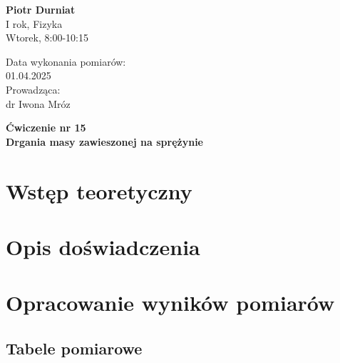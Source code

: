 \documentclass[a4paper,12pt]{article}
\begin{document}
\noindent
\begin{minipage}{0.5\textwidth}
    \raggedright
    \textbf{Piotr Durniat} \\
    I rok, Fizyka \\
    Wtorek, 8:00-10:15 \\
    \vspace{0.5cm}
    \vspace{0.5cm}
\end{minipage}%
\begin{minipage}{0.5\textwidth}
    \raggedleft
    Data wykonania pomiarów: \\
    01.04.2025 \\
    \vspace{0.5cm} %
    Prowadząca: \\
    dr Iwona Mróz
\end{minipage}

\vspace{2cm} %
\begin{center}
    \LARGE \textbf{Ćwiczenie nr 15} \\[0.5cm]
    \Large \textbf{Drgania masy zawieszonej na sprężynie}
\end{center}

\vspace{1cm} %
\noindent

\tableofcontents
\newpage

\section{Wstęp teoretyczny}

\section{Opis doświadczenia}

\section{Opracowanie wyników pomiarów}

\subsection{Tabele pomiarowe}
\end{document}
